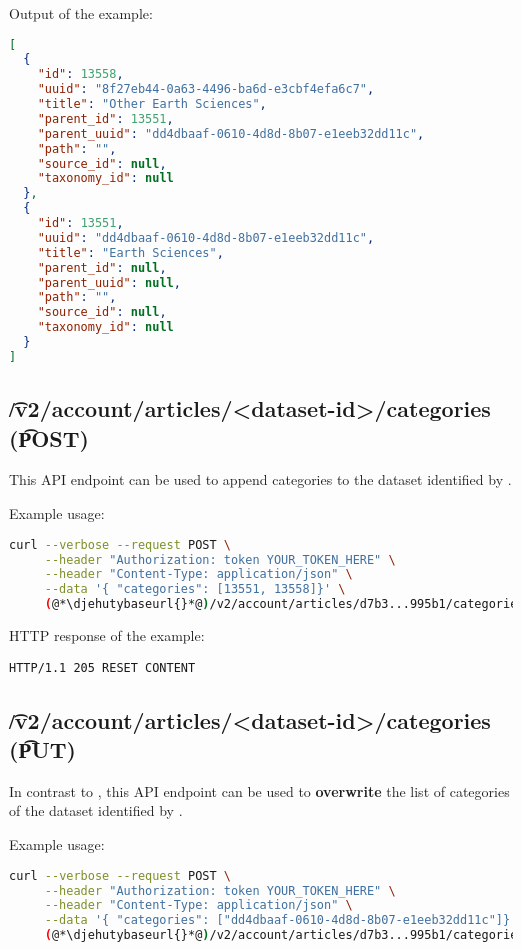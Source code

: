   Output of the example:
\begin{lstlisting}[language=JSON]
[
  {
    "id": 13558,
    "uuid": "8f27eb44-0a63-4496-ba6d-e3cbf4efa6c7",
    "title": "Other Earth Sciences",
    "parent_id": 13551,
    "parent_uuid": "dd4dbaaf-0610-4d8d-8b07-e1eeb32dd11c",
    "path": "",
    "source_id": null,
    "taxonomy_id": null
  },
  {
    "id": 13551,
    "uuid": "dd4dbaaf-0610-4d8d-8b07-e1eeb32dd11c",
    "title": "Earth Sciences",
    "parent_id": null,
    "parent_uuid": null,
    "path": "",
    "source_id": null,
    "taxonomy_id": null
  }
]
\end{lstlisting}

\subsection{\t{/v2/account/articles/<dataset-id>/categories} (\t{POST})}
\label{sec:api-v2-articles-categories-post}

  This API endpoint can be used to append categories to the dataset identified
  by .

  Example usage:
\begin{lstlisting}[language=bash]
curl --verbose --request POST \
     --header "Authorization: token YOUR_TOKEN_HERE" \
     --header "Content-Type: application/json" \
     --data '{ "categories": [13551, 13558]}' \
     (@*\djehutybaseurl{}*@)/v2/account/articles/d7b3...995b1/categories
\end{lstlisting}

  HTTP response of the example:
\begin{lstlisting}
HTTP/1.1 205 RESET CONTENT
\end{lstlisting}

\subsection{\t{/v2/account/articles/<dataset-id>/categories} (\t{PUT})}

  In contrast to , this API endpoint
  can be used to \textbf{overwrite} the list of categories of the dataset identified
  by \code{dataset-id}.

  Example usage:
\begin{lstlisting}[language=bash]
curl --verbose --request POST \
     --header "Authorization: token YOUR_TOKEN_HERE" \
     --header "Content-Type: application/json" \
     --data '{ "categories": ["dd4dbaaf-0610-4d8d-8b07-e1eeb32dd11c"]}' \
     (@*\djehutybaseurl{}*@)/v2/account/articles/d7b3...995b1/categories
\end{lstlisting}

